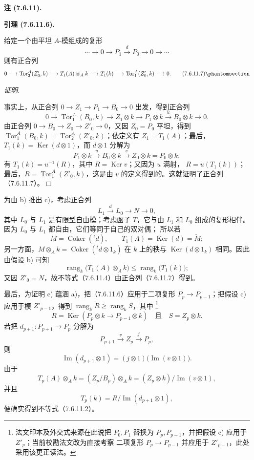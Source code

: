 \documentclass[UTF8,fontset=none,11pt,oneside,openany]{ctexbook}
\providecommand{\square}{\mdlgwhtsquare}
\newcommand{\SourceCorrectionNote}[1]{\footnote{#1}}
\newenvironment{lemma}[1][]{%
  \par\medskip\noindent\textbf{引理 (#1).}\ %
}{\par}
\newenvironment{remark}[1][]{%
  \par\medskip\noindent\textbf{注 (#1).}\ %
}{\par}
\newenvironment{proof}{%
  \par\smallskip\noindent\textit{证明.}\ %
}{\hfill$\square$\par}
\newcommand{\oldpage}[2][]{%
  \hypertarget{ega-source-page-#1-#2}{}%
  \marginnote{\scriptsize\textbf{#1}~|~#2}\ignorespaces}
\let\EGAOriginalLabel\label
\renewcommand{\label}[1]{\phantomsection\EGAOriginalLabel{#1}}
\begin{document}
\begin{remark}[7.6.11]
\begin{lemma}[7.6.11.6]
给定一个由平坦 $A$-模组成的复形
\[
  \cdots\longrightarrow0\longrightarrow
  P_1\xrightarrow{d}P_0
  \longrightarrow0\longrightarrow\cdots
\]
则有正合列
\[
  0\longrightarrow\operatorname{Tor}_2^A(Z'_0,k)
  \longrightarrow T_1(A)\otimes_A k
  \longrightarrow T_1(k)
  \longrightarrow\operatorname{Tor}_1^A(Z'_0,k)
  \longrightarrow0.
  \tag{7.6.11.7}\label{III.7.6.11.7.fr}
\]
\end{lemma}

\begin{proof}
\oldpage[III]{197}
事实上，从正合列 $0\to Z_1\to P_1\to B_0\to0$ 出发，得到正合列
\[
  0\longrightarrow\operatorname{Tor}_1^A(B_0,k)
  \longrightarrow Z_1\otimes k
  \longrightarrow P_1\otimes k
  \xrightarrow{u}B_0\otimes k
  \longrightarrow0.
\]
由正合列 $0\to B_0\to Z_0\to Z'_0\to0$，又因 $Z_0=P_0$ 平坦，得到
$\operatorname{Tor}_1^A(B_0,k)=\operatorname{Tor}_2^A(Z'_0,k)$；依定义有
$Z_1=T_1(A)$；最后，$T_1(k)=\operatorname{Ker}(d\otimes1)$，而
$d\otimes1$ 分解为
\[
  P_1\otimes k
  \xrightarrow{u}B_0\otimes k
  \xrightarrow{v}Z_0\otimes k
  =P_0\otimes k;
\]
有 $T_1(k)=u^{-1}(R)$，其中 $R=\operatorname{Ker}v$；又因为 $u$ 满射，
$R=u(T_1(k))$；最后，$R=\operatorname{Tor}_1^A(Z'_0,k)$，这是由
$v$ 的定义得到的。这就证明了正合列（7.6.11.7）。
\end{proof}

为由 b) 推出 c)，考虑正合列
\[
  L_1\xrightarrow{d}L_0\longrightarrow N\longrightarrow0,
\]
其中 $L_0$ 与 $L_1$ 是有限型自由模；考虑函子 $T$，它与由 $L_1$ 和
$L_0$ 组成的复形相伴。因为 $L_0$ 与 $L_1$ 都自由，它们等同于自己的双对偶；
所以若
\[
  M=\operatorname{Coker}({}^t d),
  \qquad
  T_1(A)=\operatorname{Ker}(d)=\check M;
\]
另一方面，$M\otimes_A k=\operatorname{Coker}({}^t d\otimes1_k)$ 在 $k$
上的秩与 $\operatorname{Ker}(d\otimes1_k)$ 相同。因此由假设 b) 可知
\[
  \operatorname{rang}_k\bigl(T_1(A)\otimes_A k\bigr)
  \leq
  \operatorname{rang}_k\bigl(T_1(k)\bigr);
\]
又因 $Z'_0=N$，故不等式（7.6.11.4）由正合列（7.6.11.7）得到。

最后，为证明 c) 蕴涵 a)，把（7.6.11.6）应用于二项复形
$P_p\longrightarrow P_{p-1}$；把假设 c) 应用于模 $Z'_{p-1}$，得到
$\operatorname{rang}_kR\geq\operatorname{rang}_kS$，其中
\SourceCorrectionNote{法文印本及外交式来源在此说把 $P_0,P_1$ 替换为
$P_p,P_{p-1}$，并把假设 c) 应用于 $Z'_p$；当前校勘法文改为直接考察
二项复形 $P_p\to P_{p-1}$ 并应用于 $Z'_{p-1}$，此处采用该更正读法。}
\[
  R=\operatorname{Ker}(P_p\otimes k\longrightarrow P_{p-1}\otimes k)
  \quad\text{且}\quad
  S=Z_p\otimes k.
\]
若把 $d_{p+1}:P_{p+1}\to P_p$ 分解为
\[
  P_{p+1}\xrightarrow{v}Z_p\xrightarrow{j}P_p,
\]
则
\[
  \operatorname{Im}(d_{p+1}\otimes1)
  =
  (j\otimes1)\bigl(\operatorname{Im}(v\otimes1)\bigr).
\]
由于
\[
  T_p(A)\otimes_A k
  =(Z_p/B_p)\otimes_A k
  =(Z_p\otimes k)/\operatorname{Im}(v\otimes1),
\]
并且
\[
  T_p(k)=R/\operatorname{Im}(d_{p+1}\otimes1),
\]
便确实得到不等式（7.6.11.2）。


\end{remark}
\end{document}
